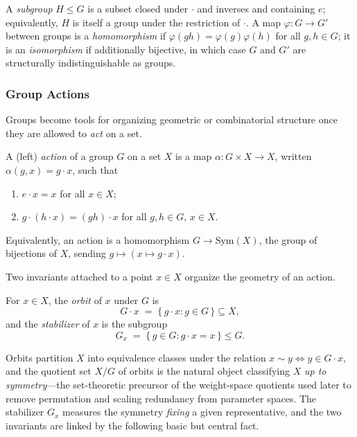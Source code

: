 \documentclass[mathematics,review,submit,moreauthors]{Definitions/mdpi}
\begin{document}
A \emph{subgroup} $H \leq G$ is a subset closed under $\cdot$ and inverses
and containing $e$; equivalently, $H$ is itself a group under the restriction
of $\cdot$. A map $\varphi : G \to G'$ between groups is a
\emph{homomorphism} if $\varphi(g h) = \varphi(g)\varphi(h)$ for all
$g, h \in G$; it is an \emph{isomorphism} if additionally bijective, in which
case $G$ and $G'$ are structurally indistinguishable as groups.

\subsubsection{Group Actions}
\label{subsec:group-actions}

Groups become tools for organizing geometric or combinatorial structure once
they are allowed to \emph{act} on a set.

\begin{Definition}
\label{def:group-action}
A (left) \emph{action} of a group $G$ on a set $X$ is a map
$\alpha : G \times X \to X$, written $\alpha(g,x) = g \cdot x$, such that
\begin{enumerate}[label=(A\arabic*), leftmargin=*, labelsep=0.5em]
    \item $e \cdot x = x$ for all $x \in X$;
    \item $g \cdot (h \cdot x) = (gh) \cdot x$ for all $g, h \in G$,
    $x \in X$.
\end{enumerate}
Equivalently, an action is a homomorphism $G \to \mathrm{Sym}(X)$, the group
of bijections of $X$, sending $g \mapsto (x \mapsto g \cdot x)$.
\end{Definition}

Two invariants attached to a point $x \in X$ organize the geometry of an
action.

\begin{Definition}
\label{def:orbit-stabilizer}
For $x \in X$, the \emph{orbit} of $x$ under $G$ is
\[
    G \cdot x \;=\; \{\, g \cdot x : g \in G \,\} \subseteq X,
\]
and the \emph{stabilizer} of $x$ is the subgroup
\[
    G_x \;=\; \{\, g \in G : g \cdot x = x \,\} \leq G.
\]
\end{Definition}

Orbits partition $X$ into equivalence classes under the relation
$x \sim y \iff y \in G \cdot x$, and the quotient set $X / G$ of orbits is
the natural object classifying $X$ \emph{up to symmetry}---the set-theoretic
precursor of the weight-space quotients used later to remove permutation and
scaling redundancy from parameter spaces. The stabilizer $G_x$ measures the
symmetry \emph{fixing} a given representative, and the two invariants are
linked by the following basic but central fact.
\end{document}
